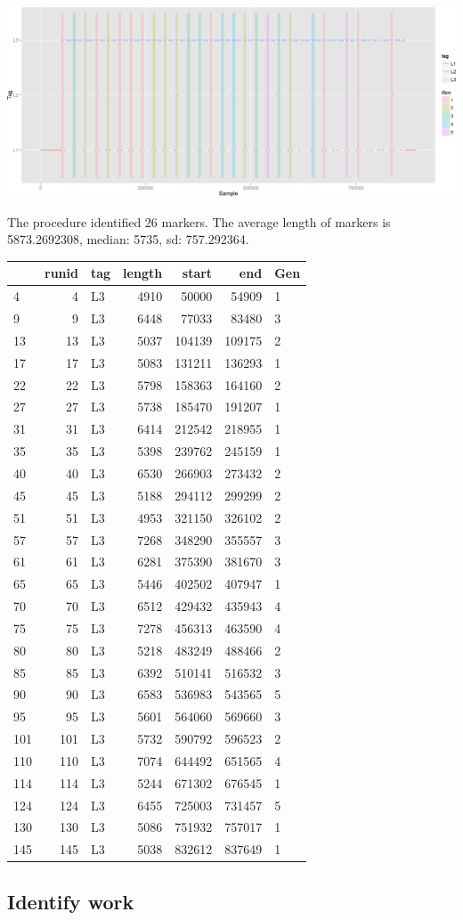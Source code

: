 \documentclass[]{article}
\begin{document}
\includegraphics{AnalysisProcedure_files/figure-latex/runs_with_markers-1.pdf}

The procedure identified 26 markers. The average length of markers is
5873.2692308, median: 5735, sd: 757.292364.

\begin{longtable}[c]{@{}lrlrrrl@{}}
\toprule
& runid & tag & length & start & end & Gen\tabularnewline
\midrule
\endhead
4 & 4 & L3 & 4910 & 50000 & 54909 & 1\tabularnewline
9 & 9 & L3 & 6448 & 77033 & 83480 & 3\tabularnewline
13 & 13 & L3 & 5037 & 104139 & 109175 & 2\tabularnewline
17 & 17 & L3 & 5083 & 131211 & 136293 & 1\tabularnewline
22 & 22 & L3 & 5798 & 158363 & 164160 & 2\tabularnewline
27 & 27 & L3 & 5738 & 185470 & 191207 & 1\tabularnewline
31 & 31 & L3 & 6414 & 212542 & 218955 & 1\tabularnewline
35 & 35 & L3 & 5398 & 239762 & 245159 & 1\tabularnewline
40 & 40 & L3 & 6530 & 266903 & 273432 & 2\tabularnewline
45 & 45 & L3 & 5188 & 294112 & 299299 & 2\tabularnewline
51 & 51 & L3 & 4953 & 321150 & 326102 & 2\tabularnewline
57 & 57 & L3 & 7268 & 348290 & 355557 & 3\tabularnewline
61 & 61 & L3 & 6281 & 375390 & 381670 & 3\tabularnewline
65 & 65 & L3 & 5446 & 402502 & 407947 & 1\tabularnewline
70 & 70 & L3 & 6512 & 429432 & 435943 & 4\tabularnewline
75 & 75 & L3 & 7278 & 456313 & 463590 & 4\tabularnewline
80 & 80 & L3 & 5218 & 483249 & 488466 & 2\tabularnewline
85 & 85 & L3 & 6392 & 510141 & 516532 & 3\tabularnewline
90 & 90 & L3 & 6583 & 536983 & 543565 & 5\tabularnewline
95 & 95 & L3 & 5601 & 564060 & 569660 & 3\tabularnewline
101 & 101 & L3 & 5732 & 590792 & 596523 & 2\tabularnewline
110 & 110 & L3 & 7074 & 644492 & 651565 & 4\tabularnewline
114 & 114 & L3 & 5244 & 671302 & 676545 & 1\tabularnewline
124 & 124 & L3 & 6455 & 725003 & 731457 & 5\tabularnewline
130 & 130 & L3 & 5086 & 751932 & 757017 & 1\tabularnewline
145 & 145 & L3 & 5038 & 832612 & 837649 & 1\tabularnewline
\bottomrule
\end{longtable}

\subsection{Identify work}\label{identify-work}
\end{document}
